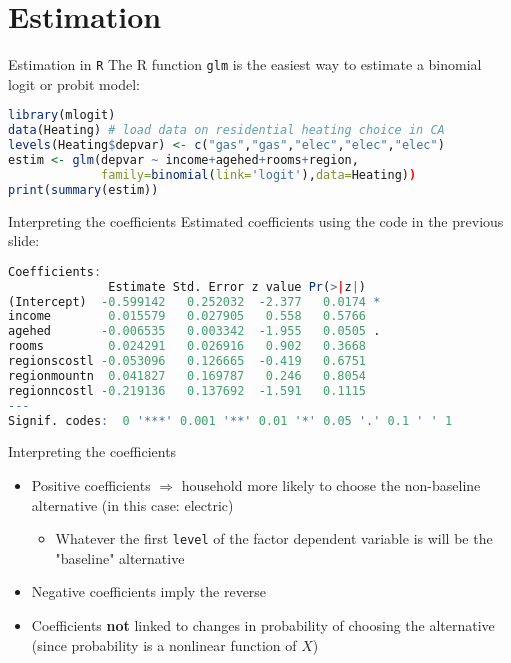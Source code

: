 \documentclass[english,aspectratio=169,12pt,xcolor=dvipsnames]{beamer}
\begin{document}
\section{Estimation}
\begin{frame}[fragile]{Estimation in \texttt{R}}
The R function \texttt{glm} is the easiest way to estimate a binomial logit or probit model:

\begin{lstlisting}[language=R]
library(mlogit)
data(Heating) # load data on residential heating choice in CA
levels(Heating$depvar) <- c("gas","gas","elec","elec","elec")
estim <- glm(depvar ~ income+agehed+rooms+region,
             family=binomial(link='logit'),data=Heating))
print(summary(estim))
\end{lstlisting}

\end{frame}




\begin{frame}[fragile]{Interpreting the coefficients}
Estimated coefficients using the code in the previous slide:

\begin{lstlisting}[language=R]
Coefficients:
              Estimate Std. Error z value Pr(>|z|)
(Intercept)  -0.599142   0.252032  -2.377   0.0174 *
income        0.015579   0.027905   0.558   0.5766
agehed       -0.006535   0.003342  -1.955   0.0505 .
rooms         0.024291   0.026916   0.902   0.3668
regionscostl -0.053096   0.126665  -0.419   0.6751
regionmountn  0.041827   0.169787   0.246   0.8054
regionncostl -0.219136   0.137692  -1.591   0.1115
---
Signif. codes:  0 '***' 0.001 '**' 0.01 '*' 0.05 '.' 0.1 ' ' 1
\end{lstlisting}

\end{frame}



\begin{frame}{Interpreting the coefficients}
\begin{itemize}
\item Positive coefficients $\Rightarrow$ household more likely to choose the non-baseline alternative (in this case: electric)
    \begin{itemize}
    \item Whatever the first \texttt{level} of the factor dependent variable is will be the "baseline" alternative
    \end{itemize}
\item Negative coefficients imply the reverse
\item Coefficients \textbf{not} linked to changes in probability of choosing the alternative (since probability is a nonlinear function of $X$)
\end{itemize}
\end{frame}
\end{document}
